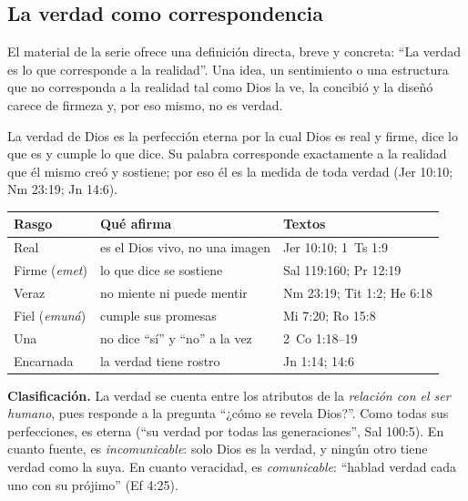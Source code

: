 \subsection{La verdad como correspondencia}
El material de la serie ofrece una definición directa, breve y concreta: ``La verdad es lo que corresponde a la realidad''. Una idea, un sentimiento o una estructura que no corresponda a la realidad tal como Dios la ve, la concibió y la diseñó carece de firmeza y, por eso mismo, no es verdad.


\begin{tcolorbox}[colback=papiro,colframe=azul,boxrule=1pt,arc=3pt,fonttitle=\bfseries,title=Definición]
La verdad de Dios es la perfección eterna por la cual Dios es real y firme, dice lo que es y cumple lo que dice. Su palabra corresponde exactamente a la realidad que él mismo creó y sostiene; por eso él es la medida de toda verdad (Jer 10:10; Nm 23:19; Jn 14:6).
\end{tcolorbox}

\begin{center}\small\renewcommand{\arraystretch}{1.2}
\begin{tabular}{@{}L{3.4cm}L{6.6cm}L{4.4cm}@{}}
\toprule
\textbf{Rasgo} & \textbf{Qué afirma} & \textbf{Textos} \\ \midrule
Real & es el Dios vivo, no una imagen & Jer 10:10; 1~Ts 1:9 \\
Firme (\emph{emet}) & lo que dice se sostiene & Sal 119:160; Pr 12:19 \\
Veraz & no miente ni puede mentir & Nm 23:19; Tit 1:2; He 6:18 \\
Fiel (\emph{emuná}) & cumple sus promesas & Mi 7:20; Ro 15:8 \\
Una & no dice ``sí'' y ``no'' a la vez & 2~Co 1:18--19 \\
Encarnada & la verdad tiene rostro & Jn 1:14; 14:6 \\
\bottomrule
\end{tabular}\end{center}

\textbf{Clasificación.} La verdad se cuenta entre los atributos de la \emph{relación con el ser humano}, pues responde a la pregunta ``¿cómo se revela Dios?''. Como todas sus perfecciones, es eterna (``su verdad por todas las generaciones'', Sal 100:5). En cuanto fuente, es \emph{incomunicable}: solo Dios es la verdad, y ningún otro tiene verdad como la suya. En cuanto veracidad, es \emph{comunicable}: ``hablad verdad cada uno con su prójimo'' (Ef 4:25).

